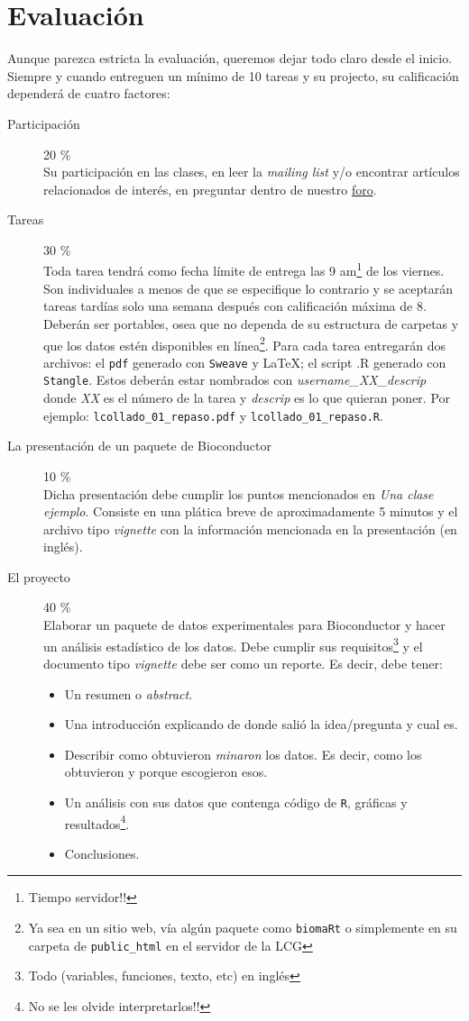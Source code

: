 \documentclass[letterpaper,12pt]{article}
\newcommand{\pl}[1]{\texttt{#1}}
\newcommand{\myurlshort}[2]{\href{http://#1}{{\textsf{#2}}}}
\begin{document}
\section{Evaluación}
Aunque parezca estricta la evaluación, queremos dejar todo claro desde el inicio. Siempre y cuando entreguen un mínimo de 10 tareas y su projecto, su calificación dependerá de cuatro factores:
  \begin{description}
  \item[Participación] 20 \% \\Su participación en las clases, en leer la \emph{mailing list} y/o encontrar artículos relacionados de interés, en preguntar dentro de nuestro \myurlshort{foros.nnb.unam.mx/viewforum.php?f=111}{foro}.
  \item[Tareas] 30 \% \\Toda tarea tendrá como fecha límite de entrega las 9 am\footnote{Tiempo servidor!!} de los viernes. Son individuales a menos de que se especifique lo contrario y se aceptarán tareas tardías solo una semana después con calificación máxima de 8. Deberán ser portables, osea que no dependa de su estructura de carpetas y que los datos estén disponibles en línea\footnote{Ya sea en un sitio web, vía algún paquete como \pl{biomaRt} o simplemente en su carpeta de \pl{public\_html} en el servidor de la LCG}. Para cada tarea entregarán dos archivos: el \pl{pdf} generado con \pl{Sweave} y \LaTeX; el script .R generado con \pl{Stangle}. Estos deberán estar nombrados con \emph{username\_XX\_descrip} donde \emph{XX} es el número de la tarea y \emph{descrip} es lo que quieran poner. Por ejemplo: \pl{lcollado\_01\_repaso.pdf} y \pl{lcollado\_01\_repaso.R}.
  \item[La presentación de un paquete de Bioconductor] 10 \% \\Dicha presentación debe cumplir los puntos mencionados en \emph{Una clase ejemplo}. Consiste en una plática breve de aproximadamente 5 minutos y el archivo tipo \emph{vignette} con la información mencionada en la presentación (en inglés).
  \item[El proyecto] 40 \% \\ Elaborar un paquete de datos experimentales para Bioconductor y hacer un análisis estadístico de los datos. Debe cumplir sus requisitos\footnote{Todo (variables, funciones, texto, etc) en inglés} y el documento tipo \emph{vignette} debe ser como un reporte. Es decir, debe tener:
  \begin{itemize}
  \item Un resumen o \emph{abstract}.
  \item Una introducción explicando de donde salió la idea/pregunta y cual es.
  \item Describir como obtuvieron \emph{minaron} los datos. Es decir, como los obtuvieron y porque escogieron esos.
  \item Un análisis con sus datos que contenga código de \pl{R}, gráficas y resultados\footnote{No se les olvide interpretarlos!!}.
  \item Conclusiones.
  \end{itemize}
  \end{description}
\end{document}
